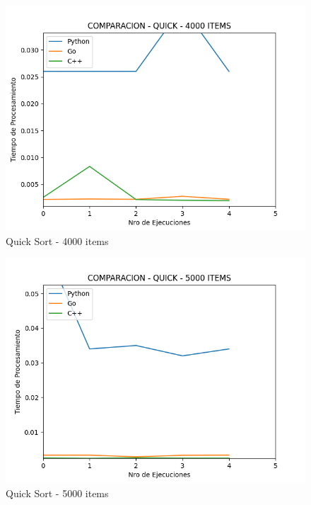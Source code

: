 \documentclass[12pt]{article} %
\begin{document}
    \begin{figure}[H]
    \centering
    \includegraphics[width=\textwidth]{quick_4000}
    \caption{Quick Sort - 4000 items}
    \end{figure}

    \vspace{5mm}
    
    \begin{figure}[H]
    \centering
    \includegraphics[width=\textwidth]{quick_5000}
    \caption{Quick Sort - 5000 items}
    \end{figure}

    \vspace{5mm}
    
\end{document}
